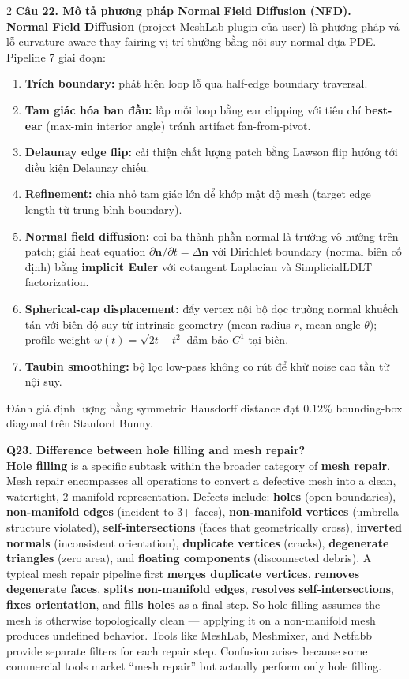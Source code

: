 \begin{paracol}{2}
\textbf{Câu 22. Mô tả phương pháp Normal Field Diffusion (NFD).}\\
\textbf{Normal Field Diffusion} (project MeshLab plugin của user) là phương pháp vá lỗ curvature-aware thay fairing vị trí thường bằng nội suy normal dựa PDE. Pipeline 7 giai đoạn:
\begin{enumerate}[leftmargin=*,nosep]
\item \textbf{Trích boundary:} phát hiện loop lỗ qua half-edge boundary traversal.
\item \textbf{Tam giác hóa ban đầu:} lấp mỗi loop bằng ear clipping với tiêu chí \textbf{best-ear} (max-min interior angle) tránh artifact fan-from-pivot.
\item \textbf{Delaunay edge flip:} cải thiện chất lượng patch bằng Lawson flip hướng tới điều kiện Delaunay chiếu.
\item \textbf{Refinement:} chia nhỏ tam giác lớn để khớp mật độ mesh (target edge length từ trung bình boundary).
\item \textbf{Normal field diffusion:} coi ba thành phần normal là trường vô hướng trên patch; giải heat equation $\partial \mathbf{n}/\partial t = \Delta \mathbf{n}$ với Dirichlet boundary (normal biên cố định) bằng \textbf{implicit Euler} với cotangent Laplacian và SimplicialLDLT factorization.
\item \textbf{Spherical-cap displacement:} đẩy vertex nội bộ dọc trường normal khuếch tán với biên độ suy từ intrinsic geometry (mean radius $r$, mean angle $\theta$); profile weight $w(t) = \sqrt{2t - t^2}$ đảm bảo $C^1$ tại biên.
\item \textbf{Taubin smoothing:} bộ lọc low-pass không co rút để khử noise cao tần từ nội suy.
\end{enumerate}
Đánh giá định lượng bằng symmetric Hausdorff distance đạt $0.12\%$ bounding-box diagonal trên Stanford Bunny.

\switchcolumn*

\textbf{Q23. Difference between hole filling and mesh repair?}\\
\textbf{Hole filling} is a specific subtask within the broader category of \textbf{mesh repair}. Mesh repair encompasses all operations to convert a defective mesh into a clean, watertight, 2-manifold representation. Defects include: \textbf{holes} (open boundaries), \textbf{non-manifold edges} (incident to 3+ faces), \textbf{non-manifold vertices} (umbrella structure violated), \textbf{self-intersections} (faces that geometrically cross), \textbf{inverted normals} (inconsistent orientation), \textbf{duplicate vertices} (cracks), \textbf{degenerate triangles} (zero area), and \textbf{floating components} (disconnected debris). A typical mesh repair pipeline first \textbf{merges duplicate vertices}, \textbf{removes degenerate faces}, \textbf{splits non-manifold edges}, \textbf{resolves self-intersections}, \textbf{fixes orientation}, and \textbf{fills holes} as a final step. So hole filling assumes the mesh is otherwise topologically clean — applying it on a non-manifold mesh produces undefined behavior. Tools like MeshLab, Meshmixer, and Netfabb provide separate filters for each repair step. Confusion arises because some commercial tools market ``mesh repair'' but actually perform only hole filling.


\end{paracol}
